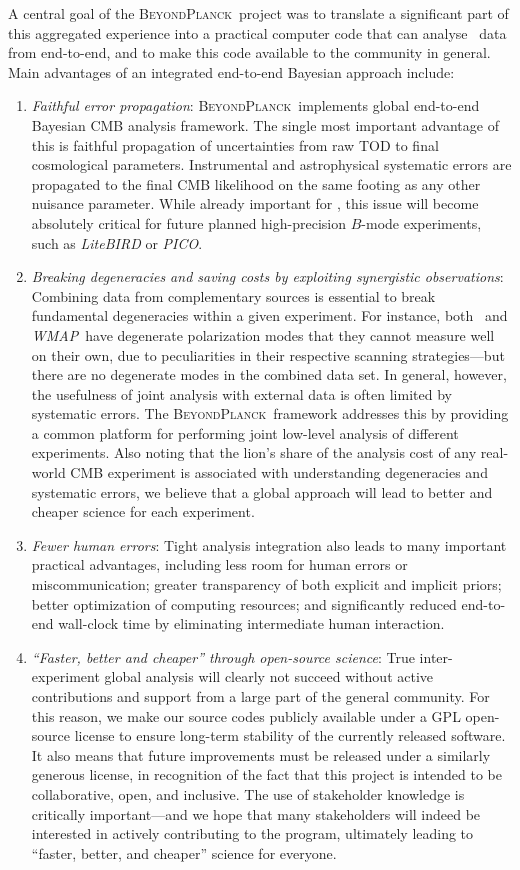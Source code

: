 \documentclass[twocolumn]{aa}
\def\WMAP{\emph{WMAP}}
\newcommand{\BP}{\textsc{BeyondPlanck}}
\begin{document}
A central goal of the \BP\ project was to translate a significant part
of this aggregated experience into a practical computer code that can
analyse \Planck\ data from end-to-end, and to make this code available
to the community in general. Main advantages of an integrated
end-to-end Bayesian approach include:
\begin{enumerate}
\item \emph{Faithful error propagation}: \BP\ implements global
  end-to-end Bayesian CMB analysis framework. The single most
  important advantage of this is faithful propagation of uncertainties
  from raw TOD to final cosmological parameters. Instrumental and
  astrophysical systematic errors are propagated to the final CMB
  likelihood on the same footing as any other nuisance
  parameter. While already important for \Planck, this issue will
  become absolutely critical for future planned high-precision
  $B$-mode experiments, such as \emph{LiteBIRD} or \emph{PICO}.
\item \emph{Breaking degeneracies and saving costs by exploiting
  synergistic observations}: Combining data from complementary sources is
  essential to break fundamental degeneracies within a given
  experiment. For instance, both \Planck\ and \WMAP\ have degenerate
  polarization modes that they cannot measure well on their own, due
  to peculiarities in their respective scanning strategies---but there
  are no degenerate modes in the combined data set. In general,
  however, the usefulness of joint analysis with external data is
  often limited by systematic errors. The \BP\ framework addresses
  this by providing a common platform for performing joint low-level
  analysis of different experiments. Also noting that the lion's share
  of the analysis cost of any real-world CMB experiment is associated
  with understanding degeneracies and systematic errors, we believe that a global approach
  will lead to better and cheaper science for each experiment.
\item \emph{Fewer human errors}: Tight analysis integration also leads
  to many important practical advantages, including less room for
  human errors or miscommunication; greater transparency of both
  explicit and implicit priors; better optimization of computing
  resources; and significantly reduced end-to-end wall-clock time by
  eliminating intermediate human interaction. 
\item \emph{``Faster, better and cheaper'' through open-source 
  science}: True inter-experiment global analysis will clearly not
  succeed without active contributions and support from a large part
  of the general community. For this reason, we make our source codes
  publicly available under a GPL open-source license to ensure
  long-term stability of the currently released software.  It
  also means that future improvements must be released under a
  similarly generous license, in recognition of the fact that this
  project is intended to be collaborative, open, and inclusive. The
  use of stakeholder knowledge is critically important---and we hope
  that many stakeholders will indeed be interested in actively
  contributing to the program, ultimately leading to ``faster, better,
  and cheaper'' science for everyone.
\end{enumerate}
\end{document}
